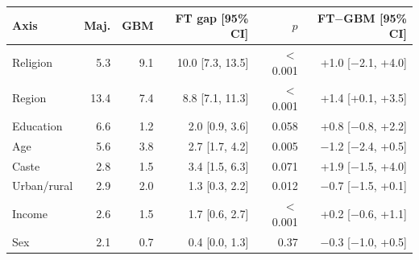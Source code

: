 \setlength{\tabcolsep}{3.2pt}
\begin{tabular}{@{}lrrrrr@{}}
\toprule
\textbf{Axis} & \textbf{Maj.} & \textbf{GBM} & \textbf{FT gap [95\% CI]} & \textbf{$p$} & \textbf{FT$-$GBM [95\% CI]} \\
\midrule
Religion & 5.3 & 9.1 & 10.0 [7.3, 13.5] & $<$0.001 & +1.0 [$-$2.1, +4.0] \\
Region & 13.4 & 7.4 & 8.8 [7.1, 11.3] & $<$0.001 & +1.4 [+0.1, +3.5] \\
Education & 6.6 & 1.2 & 2.0 [0.9, 3.6] & 0.058 & +0.8 [$-$0.8, +2.2] \\
Age & 5.6 & 3.8 & 2.7 [1.7, 4.2] & 0.005 & $-$1.2 [$-$2.4, +0.5] \\
Caste & 2.8 & 1.5 & 3.4 [1.5, 6.3] & 0.071 & +1.9 [$-$1.5, +4.0] \\
Urban/rural & 2.9 & 2.0 & 1.3 [0.3, 2.2] & 0.012 & $-$0.7 [$-$1.5, +0.1] \\
Income & 2.6 & 1.5 & 1.7 [0.6, 2.7] & $<$0.001 & +0.2 [$-$0.6, +1.1] \\
Sex & 2.1 & 0.7 & 0.4 [0.0, 1.3] & 0.37 & $-$0.3 [$-$1.0, +0.5] \\
\bottomrule
\end{tabular}